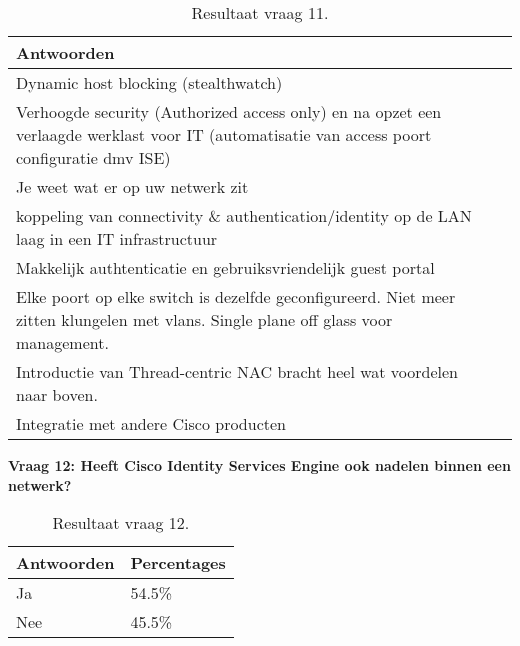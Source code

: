\begin{table}[H]
	\begin{center}
		\newlength\q
		\setlength{}
		\noindent\begin{tabular}{p{\q}p{\q}}
		\hline
		\bf Antwoorden                                                                                                                              \\ \hline
		Dynamic host blocking (stealthwatch)                                                                                                         \\ \hline
		Verhoogde security (Authorized access only) en na opzet een verlaagde werklast voor IT (automatisatie van access poort configuratie dmv ISE) \\ \hline
		Je weet wat er op uw netwerk zit                                                                                                             \\ \hline
		koppeling van connectivity \& authentication/identity op de LAN laag in een IT infrastructuur                                                \\ \hline
		Makkelijk authtenticatie en gebruiksvriendelijk guest portal                                                                                 \\ \hline
		Elke poort op elke switch is dezelfde geconfigureerd.  Niet meer zitten klungelen met vlans. Single plane off glass voor management.         \\ \hline
		Introductie van Thread-centric NAC bracht heel wat voordelen naar boven.                                                                     \\ \hline
		Integratie met andere Cisco producten                                                                                                        \\ \hline                                                        
		\end{tabular}
		\caption{Resultaat vraag 11.}
	\end{center}
\end{table}

\textbf{Vraag 12: Heeft Cisco Identity Services Engine ook nadelen binnen een netwerk?}

\begin{table}[h!]
	\begin{center}
		\begin{tabular}{|l|l|}
			\hline
			\bf Antwoorden    & \bf Percentages \\ \hline
			Ja      & 54.5\% \\ \hline
			Nee     & 45.5\%    \\ \hline                                                      
		\end{tabular}
		\caption{Resultaat vraag 12.}
	\end{center}
\end{table}

